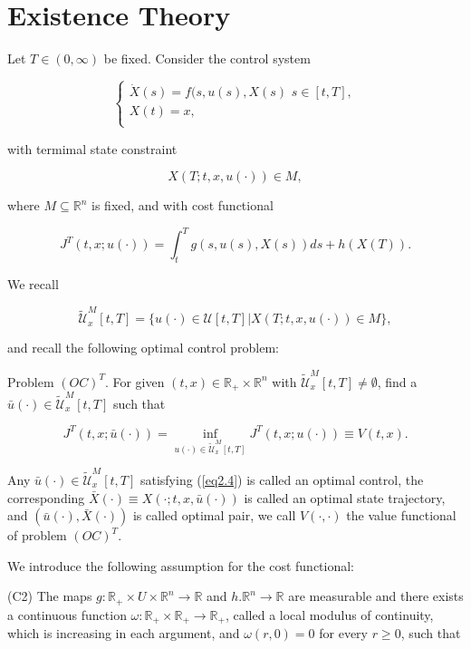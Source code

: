 \section{Existence Theory}
Let $T\in (0,\infty)$ be fixed. Consider the control system 

$$\left\{ \begin{array}{l}
	\dot{X}(s)=f(s,u(s),X(s)\,\,s\in [t,T], \\
	X(t)=x,\\
\end{array}
\right.$$

with termimal state constraint

$$X(T;t,x,u(\cdot))\in M,$$

where $M\subseteq \mathbb{R}^n$ is fixed, and with cost functional

\begin{equation*}
J^T(t,x;u(\cdot))=\int_{t}^{T}g(s,u(s),X(s))ds + h(X(T)).
\end{equation*}

We recall 

$$\tilde{\mathcal{U}}^M_x[t,T]=\{u(\cdot)\in\mathcal{U}[t,T] | 
X(T;t,x,u(\cdot))\in M\},$$

and recall the following optimal control problem:

Problem $(OC)^T$. For given $(t,x)\in \mathbb{R}_{+}\times \mathbb{R}^n$ with 
$\tilde{\mathcal{U}}^M_x[t,T]\neq\emptyset$, find a $\bar{u}(\cdot)\in 
\tilde{\mathcal{U}}^M_x[t,T]$ such that

\begin{equation}\label{eq2.4} 
J^T(t,x;\bar{u}(\cdot))=\inf_{u(\cdot)\in \tilde{\mathcal{U}}^M_x[t,T]} 
J^T(t,x;u(\cdot))\equiv V(t,x).
\end{equation}

Any $\bar{u}(\cdot)\in \tilde{\mathcal{U}}^M_x[t,T]$ satisfying (\ref{eq2.4}) 
is called an optimal control, the corresponding $\bar{X}(\cdot)\equiv 
X(\cdot;t,x,\bar{u}(\cdot))$ is called an optimal state trajectory, and 
$(\bar{u}(\cdot),\bar{X}(\cdot))$ is called optimal pair, we call 
$V(\cdot,\cdot)$ the value functional of problem $(OC)^T$.

We introduce the following assumption for the cost functional:

(C2) The maps $g:\mathbb{R}_{+}\times U\times \mathbb{R}^n\rightarrow 
\mathbb{R}$ and $h.\mathbb{R}^n\rightarrow \mathbb{R}$ are measurable and there 
exists a continuous function 
$\omega:\mathbb{R}_{+}\times\mathbb{R}_{+}\rightarrow \mathbb{R}_{+}$, called a 
local modulus of continuity, which is increasing in each argument, and 
$\omega(r,0)=0$ for every $r\geq 0$, such that 

